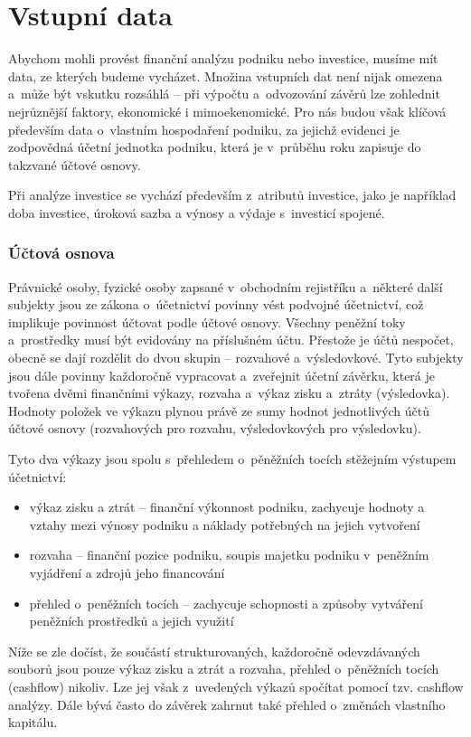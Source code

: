 \section{Vstupní data}
Abychom mohli provést finanční analýzu podniku nebo investice, musíme mít data, ze kterých budeme vycházet. Množina vstupních dat není nijak omezena a~může být vskutku rozsáhlá -- při výpočtu a~odvozování závěrů lze zohlednit nejrůznější faktory, ekonomické i mimoekenomické. Pro nás budou však klíčová především data o~vlastním hospodaření podniku, za jejichž evidenci je zodpovědná účetní jednotka podniku, která je v~průběhu roku zapisuje do takzvané účtové osnovy. 

Při analýze investice se vychází především z~atributů investice, jako je například doba investice, úroková sazba a výnosy a výdaje s~investicí spojené.

\subsubsection{Účtová osnova}
Právnické osoby, fyzické osoby zapsané v~obchodním rejistříku a~některé další subjekty jsou ze zákona o~účetnictví povinny vést podvojné účetnictví, což implikuje povinnost účtovat podle účtové osnovy. Všechny peněžní toky a~prostředky musí být evidovány na příslušném účtu. Přestože je účtů nespočet, obecně se dají rozdělit do dvou skupin -- rozvahové a~výsledovkové. Tyto subjekty jsou dále povinny každoročně vypracovat a~zveřejnit účetní závěrku, která je tvořena dvěmi finančními výkazy, rozvaha a~výkaz zisku a~ztráty (výsledovka). Hodnoty položek ve výkazu plynou právě ze sumy hodnot jednotlivých účtů účtové osnovy (rozvahových pro rozvahu, výsledovkových pro výsledovku).

Tyto dva výkazy jsou spolu s~přehledem o~pěněžních tocích stěžejním výstupem účetnictví:

\begin{itemize}
	\item výkaz zisku a ztrát -- finanční výkonnost podniku, zachycuje hodnoty a vztahy mezi výnosy podniku a náklady potřebných na jejich vytvoření
	\item rozvaha -- finanční pozice podniku, soupis majetku podniku v~peněžním vyjádření a zdrojů jeho financování
	\item přehled o~peněžních tocích -- zachycuje schopnosti a způsoby vytváření peněžních prostředků a jejich využití
\end{itemize}


Níže se zle dočíst, že součástí strukturovaných, každoročně odevzdávaných souborů jsou pouze výkaz zisku a ztrát a rozvaha, přehled o~pěněžních tocích (cashflow) nikoliv. Lze jej však z~uvedených výkazů spočítat pomocí tzv. cashflow analýzy. Dále bývá často do závěrek zahrnut také přehled o~změnách vlastního kapitálu.


